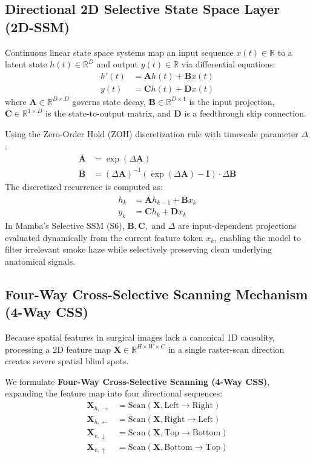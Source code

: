 \documentclass[conference]{IEEEtran}
\begin{document}
\subsection{Directional 2D Selective State Space Layer (2D-SSM)}
Continuous linear state space systems map an input sequence $x(t) \in \mathbb{R}$ to a latent state $h(t) \in \mathbb{R}^D$ and output $y(t) \in \mathbb{R}$ via differential equations:
\begin{align}
h'(t) &= \mathbf{A}h(t) + \mathbf{B}x(t) \\
y(t) &= \mathbf{C}h(t) + \mathbf{D}x(t)
\end{align}
where $\mathbf{A} \in \mathbb{R}^{D \times D}$ governs state decay, $\mathbf{B} \in \mathbb{R}^{D \times 1}$ is the input projection, $\mathbf{C} \in \mathbb{R}^{1 \times D}$ is the state-to-output matrix, and $\mathbf{D}$ is a feedthrough skip connection.

Using the Zero-Order Hold (ZOH) discretization rule with timescale parameter $\Delta$:
\begin{align}
\overline{\mathbf{A}} &= \exp(\Delta \mathbf{A}) \\
\overline{\mathbf{B}} &= (\Delta \mathbf{A})^{-1}(\exp(\Delta \mathbf{A}) - \mathbf{I}) \cdot \Delta \mathbf{B}
\end{align}
The discretized recurrence is computed as:
\begin{align}
h_k &= \overline{\mathbf{A}} h_{k-1} + \overline{\mathbf{B}} x_k \\
y_k &= \mathbf{C} h_k + \mathbf{D} x_k
\end{align}
In Mamba's Selective SSM (S6), $\mathbf{B}, \mathbf{C},$ and $\Delta$ are input-dependent projections evaluated dynamically from the current feature token $x_k$, enabling the model to filter irrelevant smoke haze while selectively preserving clean underlying anatomical signals.

\subsection{Four-Way Cross-Selective Scanning Mechanism (4-Way CSS)}
Because spatial features in surgical images lack a canonical 1D causality, processing a 2D feature map $\mathbf{X} \in \mathbb{R}^{H \times W \times C}$ in a single raster-scan direction creates severe spatial blind spots. 

We formulate \textbf{Four-Way Cross-Selective Scanning (4-Way CSS)}, expanding the feature map into four directional sequences:
\begin{align}
\mathbf{X}_{h, \rightarrow} &= \text{Scan}(\mathbf{X}, \text{Left} \rightarrow \text{Right}) \\
\mathbf{X}_{h, \leftarrow} &= \text{Scan}(\mathbf{X}, \text{Right} \rightarrow \text{Left}) \\
\mathbf{X}_{v, \downarrow} &= \text{Scan}(\mathbf{X}, \text{Top} \rightarrow \text{Bottom}) \\
\mathbf{X}_{v, \uparrow} &= \text{Scan}(\mathbf{X}, \text{Bottom} \rightarrow \text{Top})
\end{align}
\end{document}
